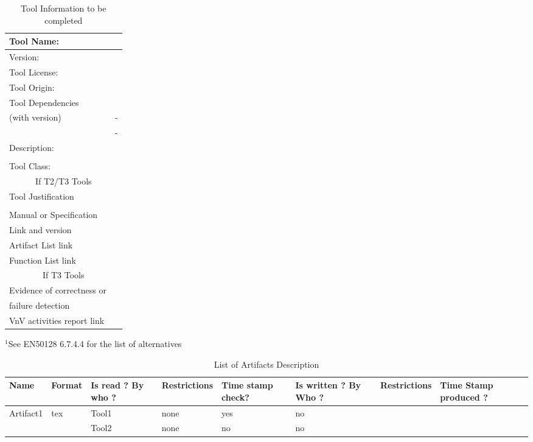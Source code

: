 \begin{table}[htbp]
\centering
\caption{\label{tbl:tool-info}Tool Information to be completed}

\begin{tabular}{|l|p{5cm}|}\hline
Tool Name: & \\\hline
Version: & \\\hline
Tool License: & \\\hline
Tool Origin: &\\\hline
Tool Dependencies & \\
(with version) & -\\
 & -\\ \hline
Description: & \\
 & \\ \hline
Tool Class: & \\\hline
\multicolumn{2}{|c|}{If T2/T3 Tools}\\\hline
Tool Justification & \\
 & \\ \hline
Manual or Specification & \\
Link and version & \\\hline
Artifact List link & \\\hline
Function List link& \\\hline
\multicolumn{2}{|c|}{If T3 Tools}\\\hline
Evidence of correctness or  & \\
failure detection \footnotemark& \\\hline
VnV activities report link&\\\hline
\end{tabular}

\vspace{1em}
$^1$\footnotesize{See EN50128 6.7.4.4 for the list of alternatives}
\end{table}


\begin{table}[htbp]
\caption{\label{tbl:artifacts} List of  Artifacts Description}
{\small
\begin{tabular}{|p{4em}|l|p{1.5cm}|l|p{5em}|p{1.8cm}|l|p{5em}|}\hline
Name & Format & Is read ? By who ?& Restrictions & Time stamp check? &Is
written ? By Who ?& Restrictions & Time Stamp produced ?\\\hline
\multirow{2}{*}{Artifact1} & \multirow{2}{*}{tex} & Tool1 & none & yes &no & &\\\cline{3-8}
                           & & Tool2 & none& no & no & &\\\hline
\end{tabular}
}
\end{table}


